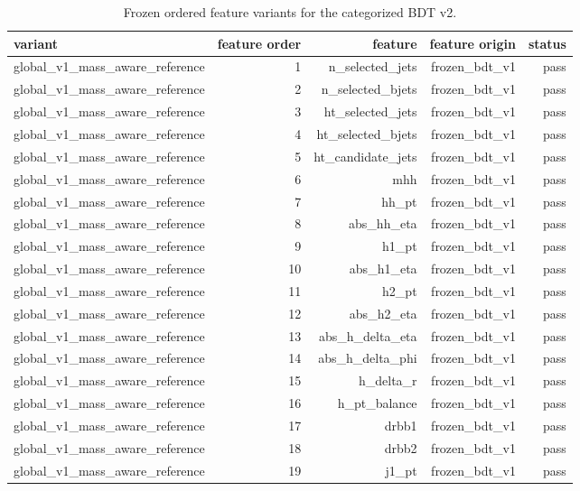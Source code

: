 \begin{table}[htbp]
\centering
\small
\caption{Frozen ordered feature variants for the categorized BDT v2.}
\label{tab:hh4b\_bdt\_v2\_feature\_contracts}
\begin{tabular}{lrrrr}
\toprule
variant & feature order & feature & feature origin & status \\
\midrule
global\_v1\_mass\_aware\_reference & 1 & n\_selected\_jets & frozen\_bdt\_v1 & pass \\
global\_v1\_mass\_aware\_reference & 2 & n\_selected\_bjets & frozen\_bdt\_v1 & pass \\
global\_v1\_mass\_aware\_reference & 3 & ht\_selected\_jets & frozen\_bdt\_v1 & pass \\
global\_v1\_mass\_aware\_reference & 4 & ht\_selected\_bjets & frozen\_bdt\_v1 & pass \\
global\_v1\_mass\_aware\_reference & 5 & ht\_candidate\_jets & frozen\_bdt\_v1 & pass \\
global\_v1\_mass\_aware\_reference & 6 & mhh & frozen\_bdt\_v1 & pass \\
global\_v1\_mass\_aware\_reference & 7 & hh\_pt & frozen\_bdt\_v1 & pass \\
global\_v1\_mass\_aware\_reference & 8 & abs\_hh\_eta & frozen\_bdt\_v1 & pass \\
global\_v1\_mass\_aware\_reference & 9 & h1\_pt & frozen\_bdt\_v1 & pass \\
global\_v1\_mass\_aware\_reference & 10 & abs\_h1\_eta & frozen\_bdt\_v1 & pass \\
global\_v1\_mass\_aware\_reference & 11 & h2\_pt & frozen\_bdt\_v1 & pass \\
global\_v1\_mass\_aware\_reference & 12 & abs\_h2\_eta & frozen\_bdt\_v1 & pass \\
global\_v1\_mass\_aware\_reference & 13 & abs\_h\_delta\_eta & frozen\_bdt\_v1 & pass \\
global\_v1\_mass\_aware\_reference & 14 & abs\_h\_delta\_phi & frozen\_bdt\_v1 & pass \\
global\_v1\_mass\_aware\_reference & 15 & h\_delta\_r & frozen\_bdt\_v1 & pass \\
global\_v1\_mass\_aware\_reference & 16 & h\_pt\_balance & frozen\_bdt\_v1 & pass \\
global\_v1\_mass\_aware\_reference & 17 & drbb1 & frozen\_bdt\_v1 & pass \\
global\_v1\_mass\_aware\_reference & 18 & drbb2 & frozen\_bdt\_v1 & pass \\
global\_v1\_mass\_aware\_reference & 19 & j1\_pt & frozen\_bdt\_v1 & pass \\

\end{tabular}
\end{table}
